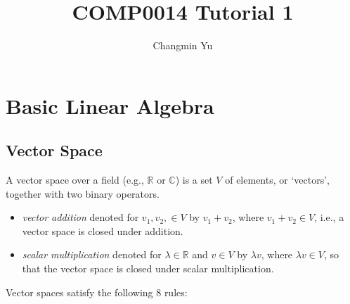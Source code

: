 \documentclass[12pt]{article}
\title{COMP0014 Tutorial 1}
\author{Changmin Yu}
\date{}
\begin{document}
\maketitle

\section*{Basic Linear Algebra}
\subsection*{Vector Space}
A vector space over a field (e.g., $\mathbb{R}$ or $\mathbb{C}$) is a set $V$ of elements, or `vectors', together with two binary operators.
\begin{itemize}
    \item \textit{vector addition} denoted for $v_{1}, v_{2}, \in V$ by $v_{1} + v_{2}$, where $v_{1}+v_{2}\in V$, i.e., a vector space is closed under addition.
    \item \textit{scalar multiplication} denoted for $\lambda\in\mathbb{R}$ and $v\in V$ by $\lambda v$, where $\lambda v\in V$, so that the vector space is closed under scalar multiplication.
\end{itemize}
Vector spaces satisfy the following 8 rules:
\end{document}
